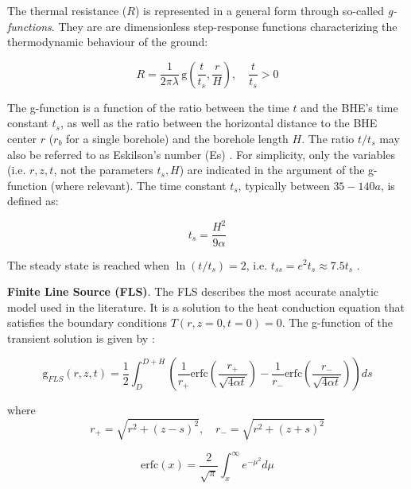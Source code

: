 The thermal resistance ($R$) is represented in a general form through so-called \textit{g-functions}. They are are dimensionless step-response functions characterizing the thermodynamic behaviour of the ground:

\begin{equation}
    R = \frac{1}{2 \pi \lambda} \, \mathrm{g}\left( \frac{t}{t_s}, \frac{r}{H} \right), \quad \frac{t}{t_s} > 0
\end{equation}

The g-function is a function of the ratio between the time $t$ and the BHE's time constant $t_s$, as well as the ratio between the horizontal distance to the BHE center $r$ ($r_b$ for a single borehole) and the borehole length $H$. The ratio $t/t_s$ may also be referred to as Eskilson's number (Es) \citep{pahud_geothermal_2002}. For simplicity, only the variables (i.e. $r, z, t$, not the parameters $t_s, H$) are indicated in the argument of the g-function (where relevant). The time constant $t_s$, typically between $35-140a$, is defined as:

\begin{equation}
    t_s = \frac{H^2}{9 \alpha}
\end{equation}

The steady state is reached when $\ln{(t/t_s)} = 2$, i.e. $t_{ss} = e^2 t_s \approx 7.5 t_s$ \citep{wagner_erdsondenpotenzial_2014}. 

\textbf{Finite Line Source (FLS)}. 
The FLS describes the most accurate analytic model used in the literature. It is a solution to the heat conduction equation that satisfies the boundary conditions $T(r, z=0, t=0) = 0$. The g-function of the transient solution is given by \citep{pahud_geothermal_2002}:

\begin{equation}
\label{eq:FLS}
    \mathrm{g}_{FLS}(r, z, t) = \frac{1}{2} \int_{D}^{D+H} \left( \frac{1}{r_+} \mathrm{erfc}\left(\frac{r_+}{\sqrt{4 \alpha t}}\right) - \frac{1}{r_-}\mathrm{erfc}\left(\frac{r_-}{\sqrt{4 \alpha t}}\right) \right) ds
\end{equation}

where
\begin{equation*}
    r_+ = \sqrt{r^2 + (z - s)^2}, \quad r_- = \sqrt{r^2 + (z + s)^2}
\end{equation*}

\begin{equation*}
   \mathrm{erfc}(x) = \frac{2}{\sqrt{\pi}} \int_{x}^{\infty} e^{-\mu^2} d\mu
\end{equation*}

